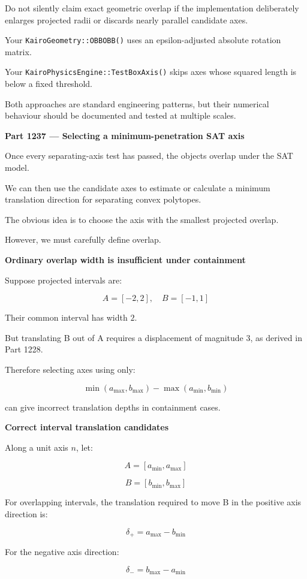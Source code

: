 Do not silently claim exact geometric overlap if the implementation deliberately enlarges projected radii or discards nearly parallel candidate axes.

Your \texttt{KairoGeometry::OBBOBB()} uses an epsilon-adjusted absolute rotation matrix.

Your \texttt{KairoPhysicsEngine::TestBoxAxis()} skips axes whose squared length is below a fixed threshold.

Both approaches are standard engineering patterns, but their numerical behaviour should be documented and tested at multiple scales.

\textbf{Part 1237 --- Selecting a minimum-penetration SAT axis}

Once every separating-axis test has passed, the objects overlap under the SAT model.

We can then use the candidate axes to estimate or calculate a minimum translation direction for separating convex polytopes.

The obvious idea is to choose the axis with the smallest projected overlap.

However, we must carefully define overlap.

\textbf{Ordinary overlap width is insufficient under containment}

Suppose projected intervals are:

\[
A=[-2,2],\quad B=[-1,1]
\]

Their common interval has width \(2\).

But translating B out of A requires a displacement of magnitude \(3\), as derived in Part 1228.

Therefore selecting axes using only:

\[
\min(a_{\max},b_{\max})- \max(a_{\min},b_{\min})
\]

can give incorrect translation depths in containment cases.

\textbf{Correct interval translation candidates}

Along a unit axis \(n\), let:

\[
A=[a_{\min},a_{\max}]
\]

\[
B=[b_{\min},b_{\max}]
\]

For overlapping intervals, the translation required to move B in the positive axis direction is:

\[
\boxed{ \delta_+=a_{\max}-b_{\min} }
\]

For the negative axis direction:

\[
\boxed{ \delta_-=b_{\max}-a_{\min} }
\]

